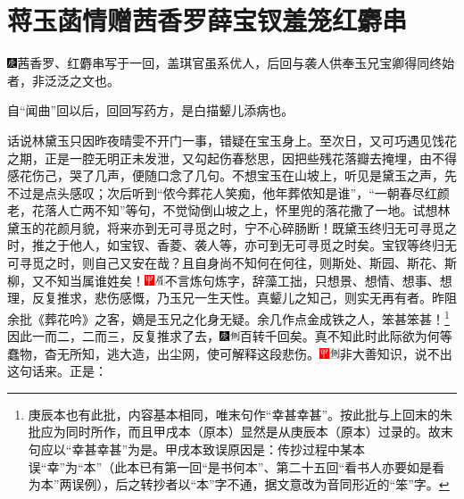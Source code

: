 

\chapter{蒋玉菡情赠茜香罗\hspace{.5em}薛宝钗羞笼红麝串}

{\includegraphics[width=3mm]{../Images/00004}\kaishu 茜香罗、红麝串写于一回，盖琪官虽系优人，后回与袭人供奉玉兄宝卿得同终始者，非泛泛之文也。}

{\kaishu 自“闻曲”回以后，回回写药方，是白描颦儿添病也。}

话说林黛玉只因昨夜晴雯不开门一事，错疑在宝玉身上。至次日，又可巧遇见饯花之期，正是一腔无明正未发泄，又勾起伤春愁思，因把些残花落瓣去掩埋，由不得感花伤己，哭了几声，便随口念了几句。不想宝玉在山坡上，听见是黛玉之声，先不过是点头感叹；次后听到“侬今葬花人笑痴，他年葬侬知是谁”，“一朝春尽红颜老，花落人亡两不知”等句，不觉恸倒山坡之上，怀里兜的落花撒了一地。试想林黛玉的花颜月貌，将来亦到无可寻觅之时，宁不心碎肠断！既黛玉终归无可寻觅之时，推之于他人，如宝钗、香菱、袭人等，亦可到无可寻觅之时矣。宝钗等终归无可寻觅之时，则自己又安在哉？且自身尚不知何在何往，则斯处、斯园、斯花、斯柳，又不知当属谁姓矣！{\includegraphics[width=3mm]{../Images/00002}\includegraphics[width=3mm]{../Images/00010}\footnotesize \kaishu 不言炼句炼字，辞藻工拙，只想景、想情、想事、想理，反复推求，悲伤感慨，乃玉兄一生天性。真颦儿之知己，则实无再有者。昨阻余批《葬花吟》之客，嫡是玉兄之化身无疑。余几作点金成铁之人，笨甚笨甚！}\footnote{庚辰本也有此批，内容基本相同，唯末句作“幸甚幸甚”。按此批与上回末的朱批应为同时所作，而且甲戌本（原本）显然是从庚辰本（原本）过录的。故末句应以“幸甚幸甚”为是。甲戌本致误原因是：传抄过程中某本误“幸”为“本”（此本已有第一回“是书何本”、第二十五回“看书人亦要如是看为本”两误例），后之转抄者以“本”字不通，据文意改为音同形近的“笨”字。}因此一而二，二而三，反复推求了去，{\includegraphics[width=3mm]{../Images/00004}\includegraphics[width=3mm]{../Images/00011}\footnotesize \kaishu 百转千回矣。}真不知此时此际欲为何等蠢物，杳无所知，逃大造，出尘网，使可解释这段悲伤。{\includegraphics[width=3mm]{../Images/00002}\includegraphics[width=3mm]{../Images/00011}\footnotesize \kaishu 非大善知识，说不出这句话来。}正是：

